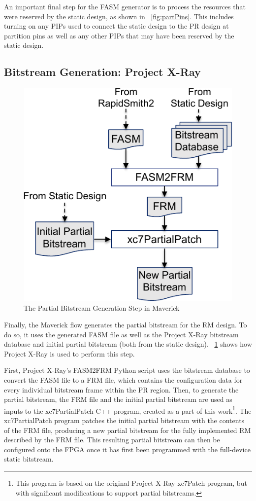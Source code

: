 An important final step for the FASM generator is to process the resources that were reserved by the static design, as shown in \figurename~\ref{fig:partPins}.
This includes turning on any PIPs used to connect the static design to the PR design at partition pins as well as any other PIPs that may have been reserved by the static design.
 
\subsection{Bitstream Generation: Project X-Ray}
\begin{figure}
	\centering
	\includegraphics[width=0.62\columnwidth]{figures/bitgen.pdf}
	\caption{The Partial Bitstream Generation Step in Maverick}
	\label{fig:bitgen}
\end{figure}

Finally, the Maverick flow generates the partial bitstream for the RM design.
To do so, it uses the generated FASM file as well as the Project X-Ray bitstream database and initial partial bitstream (both from the static design). 
\figurename~\ref{fig:bitgen} shows how Project X-Ray is used to perform this step.

First, Project X-Ray's FASM2FRM Python script uses the bitstream database to convert the FASM file to a FRM file, which contains the configuration data for every individual bitstream frame within the PR region.
Then, to generate the partial bitstream, the FRM file and the initial partial bitstream are used as inputs to the xc7PartialPatch C++ program, created as a part of this work\footnote{This program is based on the original Project X-Ray xc7Patch program, but with significant modifications to support partial bitstreams.}.
The xc7PartialPatch program patches the initial partial bitstream with the contents of the FRM file, producing a new partial bitstream for the fully implemented RM described by the FRM file.
This resulting partial bitstream can then be configured onto the FPGA once it has first been programmed with the full-device static bitstream.
